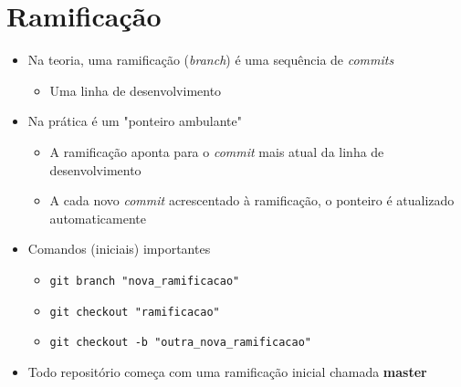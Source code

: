 \documentclass{beamer}
\newenvironment{slide}{\begin{frame}{\insertsection}}{\end{frame}}
\begin{document}
\section{Ramificação}
\begin{slide}
    \begin{itemize}
        \item Na teoria, uma ramificação (\emph{branch}) é uma sequência de
            \emph{commits}
        \begin{itemize}
            \pause
            \item Uma linha de desenvolvimento
        \end{itemize}
        \pause
        \item Na prática é um "ponteiro ambulante"
        \begin{itemize}
            \pause
            \item A ramificação aponta para o \emph{commit} mais atual da linha
                de desenvolvimento
            \pause
            \item A cada novo \emph{commit} acrescentado à ramificação, o
                ponteiro é atualizado automaticamente
        \end{itemize}
        \pause
        \item Comandos (iniciais) importantes
        \begin{itemize}
            \pause
            \item \texttt{git branch "nova\_ramificacao"}
            \pause
            \item \texttt{git checkout "ramificacao"}
            \pause
            \item \texttt{git checkout -b "outra\_nova\_ramificacao"}
        \end{itemize}
        \pause
        \item Todo repositório começa com uma ramificação inicial chamada
            \textbf{master}
    \end{itemize}
\end{slide}
\end{document}

